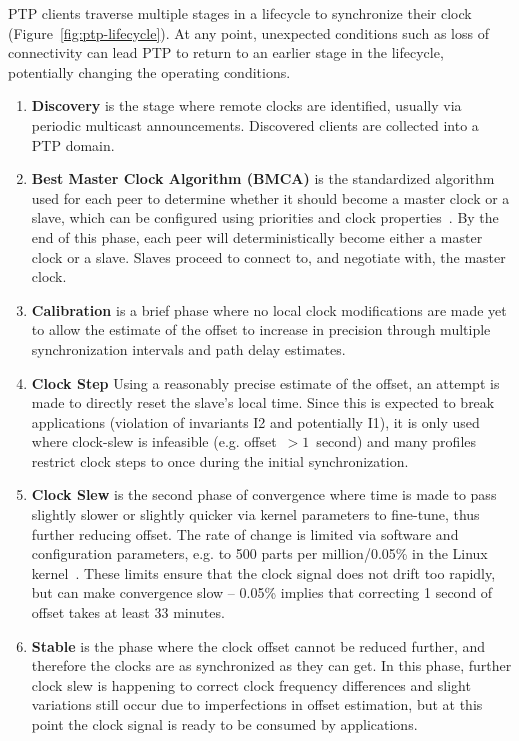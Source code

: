PTP clients traverse multiple stages in a lifecycle to synchronize their clock (Figure~\ref{fig:ptp-lifecycle}). At any point, unexpected conditions such as loss of connectivity can lead PTP to return to an earlier stage in the lifecycle, potentially changing the operating conditions.

\begin{enumerate}[label=S\arabic*.]
    \item \textbf{Discovery} is the stage where remote clocks are identified, usually via periodic multicast announcements. Discovered clients are collected into a PTP domain.
    \item \textbf{Best Master Clock Algorithm (BMCA)} is the standardized algorithm used for each peer to determine whether it should become a master clock or a slave, which can be configured using priorities and clock properties~\cite{bmca-deep-dive}. By the end of this phase, each peer will deterministically become either a master clock or a slave. Slaves proceed to connect to, and negotiate with, the master clock.
    \item \textbf{Calibration} is a brief phase where no local clock modifications are made yet to allow the estimate of the offset to increase in precision through multiple synchronization intervals and path delay estimates.
    \item \textbf{Clock Step} Using a reasonably precise estimate of the offset, an attempt is made to directly reset the slave's local time. Since this is expected to break applications (violation of invariants I2 and potentially I1), it is only used where clock-slew is infeasible (e.g. offset~$>1$~second) and many profiles restrict clock steps to once during the initial synchronization.
    \item \textbf{Clock Slew} is the second phase of convergence where time is made to pass slightly slower or slightly quicker via kernel parameters to fine-tune, thus further reducing offset. The rate of change is limited via software and configuration parameters, e.g. to 500 parts per million/0.05\% in the Linux kernel~\cite{adjtimex}. These limits ensure that the clock signal does not drift too rapidly, but can make convergence slow -- 0.05\% implies that correcting 1 second of offset takes at least 33 minutes.
    \item \textbf{Stable} is the phase where the clock offset cannot be reduced further, and therefore the clocks are as synchronized as they can get. In this phase, further clock slew is happening to correct clock frequency differences and slight variations still occur due to imperfections in offset estimation, but at this point the clock signal is ready to be consumed by applications.
\end{enumerate}

